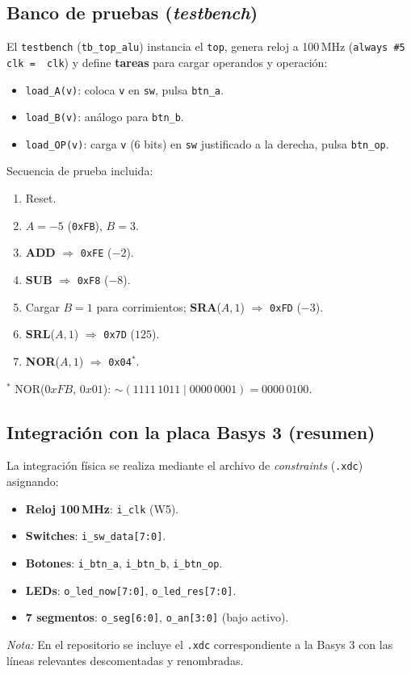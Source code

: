 \subsection{Banco de pruebas (\textit{testbench})}
El \texttt{testbench} (\texttt{tb\_top\_alu}) instancia el \texttt{top}, genera reloj a 100\,MHz (\texttt{always \#5 clk = \string~clk}) y define \textbf{tareas} para cargar operandos y operación:
\begin{itemize}
    \item \texttt{load\_A(v)}: coloca \texttt{v} en \texttt{sw}, pulsa \texttt{btn\_a}.
    \item \texttt{load\_B(v)}: análogo para \texttt{btn\_b}.
    \item \texttt{load\_OP(v)}: carga \texttt{v} (6 bits) en \texttt{sw} justificado a la derecha, pulsa \texttt{btn\_op}.
\end{itemize}
Secuencia de prueba incluida:
\begin{enumerate}
    \item Reset.
    \item $A = -5$ (\texttt{0xFB}), $B = 3$.
    \item \textbf{ADD} $\Rightarrow$ \texttt{0xFE} ($-2$).
    \item \textbf{SUB} $\Rightarrow$ \texttt{0xF8} ($-8$).
    \item Cargar $B=1$ para corrimientos; \textbf{SRA}($A,1$) $\Rightarrow$ \texttt{0xFD} ($-3$).
    \item \textbf{SRL}($A,1$) $\Rightarrow$ \texttt{0x7D} ($125$).
    \item \textbf{NOR}($A,1$) $\Rightarrow$ \texttt{0x04}$^\ast$.
\end{enumerate}
\noindent\textit{$^\ast$} NOR($0xFB$, $0x01$): $\sim(1111\,1011 \;|\; 0000\,0001)=0000\,0100$.

\subsection{Integración con la placa Basys 3 (resumen)}
La integración física se realiza mediante el archivo de \textit{constraints} (\texttt{.xdc}) asignando:
\begin{itemize}
    \item \textbf{Reloj 100\,MHz}: \texttt{i\_clk} (W5).
    \item \textbf{Switches}: \texttt{i\_sw\_data[7:0]}.
    \item \textbf{Botones}: \texttt{i\_btn\_a}, \texttt{i\_btn\_b}, \texttt{i\_btn\_op}.
    \item \textbf{LEDs}: \texttt{o\_led\_now[7:0]}, \texttt{o\_led\_res[7:0]}.
    \item \textbf{7 segmentos}: \texttt{o\_seg[6:0]}, \texttt{o\_an[3:0]} (bajo activo).
\end{itemize}
\textit{Nota:} En el repositorio se incluye el \texttt{.xdc} correspondiente a la Basys 3 con las líneas relevantes descomentadas y renombradas.
